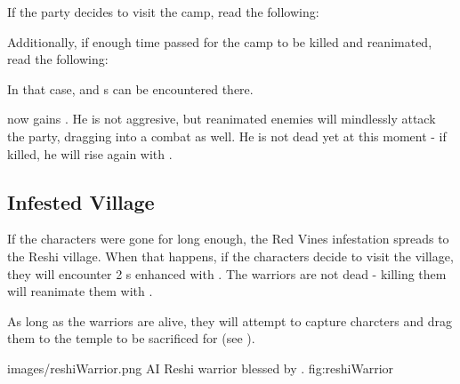 If the party decides to visit the camp, read the following:


Additionally, if enough time passed for the camp to be killed and reanimated, read the following:


In that case, \enemyReanimatedPerson{} and \enemyReanimatedAxehound{}s can be encountered there.

\npcMedic{} now gains \textbf{\abilityVinesName[2]}. He is not aggresive, but reanimated enemies will mindlessly attack the party, dragging \npcMedic{} into a combat as well. He is not dead yet at this moment - if killed, he will rise again with \textbf{\abilityHuskName[2]}.

\newpage %
\subsection{Infested Village}

If the characters were gone for long enough, the Red Vines infestation spreads to the Reshi village. When that happens, if the characters decide to visit the village, they will encounter 2 \enemyReshiWarrior{}s enhanced with \textbf{\abilityVinesName[2]}. The warriors are not dead - killing them will reanimate them with \textbf{\abilityHuskName[2]}.

As long as the warriors are alive, they will attempt to capture charcters and drag them to the temple to be sacrificed for \npcSprenVines{} (see ).

					{images/reshiWarrior.png}
					{AI}
					{Reshi warrior blessed by \npcSprenVines{}.}
					{fig:reshiWarrior}
